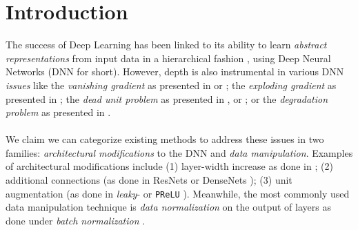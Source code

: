 \section{Introduction}\label{sec:introduction}
The success of Deep Learning has been linked to its ability to learn \emph{abstract representations} from input data in a hierarchical fashion  \cite{LeCun06atutorial,ramachandranEtAl2017SearchingForActivationFunctions}, using Deep Neural Networks (DNN for short). However, depth is also instrumental in various DNN \emph{issues} like the \emph{vanishing gradient} as presented in \cite{vanishing1} or \cite{vanishing2}; the \emph{exploding gradient} as presented in \cite{exploding}; the \emph{dead unit problem} as presented in \cite{leaky},\cite{whyreludie} or \cite{whenneuronsfail}; or the \emph{degradation problem} as presented in \cite{resnet}. 
\\\\
We claim we can categorize existing methods to address these issues in two families: \emph{architectural modifications} to the DNN and \emph{data manipulation}. Examples of architectural modifications include (1) layer-width increase as done in \cite{wideresnet,inceptionv1}; (2) additional connections (as done in ResNets \cite{resnet} or DenseNets \cite{densenet}); (3) unit augmentation (as done in \emph{leaky}-\ReLU \cite{leaky} or \texttt{PReLU} \cite{prelu}). Meanwhile, the most commonly used data manipulation technique is \emph{data normalization} on the output of layers as done under \emph{batch normalization} \cite{batchnorm}.  
\\\\

